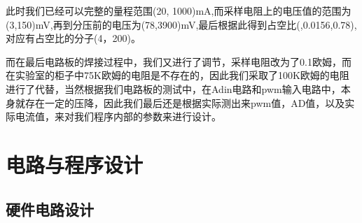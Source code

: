 \documentclass{zjureport}
\begin{document}
        此时我们已经可以完整的量程范围(20, 1000)mA,而采样电阻上的电压值的范围为(3,150)mV,再到分压前的电压为(78,3900)mV,最后根据此得到占空比(,0.0156,0.78),对应有占空比的分子(4，200)。
  
        而在最后电路板的焊接过程中，我们又进行了调节，采样电阻改为了0.1欧姆，而在实验室的柜子中75K欧姆的电阻是不存在的，因此我们采取了100K欧姆的电阻进行了代替，当然根据我们电路板的测试中，在Adin电路和pwm输入电路中，本身就存在一定的压降，因此我们最后还是根据实际测出来pwm值，AD值，以及实际电流值，来对我们程序内部的参数来进行设计。
        \newpage

    \section{电路与程序设计}
        \subsection{硬件电路设计}
\end{document}
